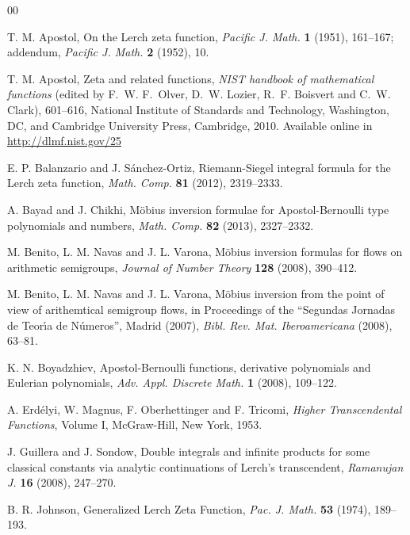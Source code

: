 \documentclass[11pt,a4paper,reqno]{amsart}
\theoremstyle{plain}
\theoremstyle{remark}
\numberwithin{equation}{section}
\begin{document}
\begin{thebibliography}{00}

T. M. Apostol,
On the Lerch zeta function,
\textit{Pacific J. Math.}
\textbf{1} (1951), 161--167;
addendum, \textit{Pacific J. Math.} \textbf{2} (1952), 10.

T. M. Apostol,
Zeta and related functions,
\textit{NIST handbook of mathematical functions}
(edited by F.~W. F.~Olver, D.~W. Lozier, R.~F. Boisvert and C.~W. Clark),
601--616,
National Institute of Standards and Technology, Washington, DC, and
Cambridge University Press, Cambridge, 2010.
Available online in \url{http://dlmf.nist.gov/25}

E. P. Balanzario and J. S\'{a}nchez-Ortiz,
Riemann-Siegel integral formula for the Lerch zeta function,
\textit{Math. Comp.}
\textbf{81} (2012), 2319--2333.

A. Bayad and J. Chikhi,
M\"obius inversion formulae for Apostol-Bernoulli type polynomials and numbers,
\textit{Math. Comp.}
\textbf{82} (2013), 2327--2332.

M. Benito, L. M. Navas and J. L. Varona,
M\"{o}bius inversion formulas for flows on arithmetic semigroups,
\textit{Journal of Number Theory}
\textbf{128} (2008), 390--412.


M. Benito, L. M. Navas and J. L. Varona,
M\"{o}bius inversion from the point of view of arithemtical semigroup flows, in
Proceedings of the ``Segundas Jornadas de Teor\'{\i}a de N\'{u}meros'', Madrid (2007),
\textit{Bibl. Rev. Mat. Iberoamericana}
(2008), 63--81.


K. N. Boyadzhiev,
Apostol-Bernoulli functions, derivative polynomials and Eulerian polynomials,
\textit{Adv. Appl. Discrete Math.}
\textbf{1} (2008), 109--122.

A. Erd\'{e}lyi, W. Magnus, F. Oberhettinger and F. Tricomi,
\textit{Higher Transcendental Functions}, Volume I,
McGraw-Hill, New York, 1953.

J. Guillera and J. Sondow,
Double integrals and infinite products for some classical constants via analytic continuations of Lerch's transcendent,
\textit{Ramanujan J.}
\textbf{16} (2008), 247--270.

B. R. Johnson,
Generalized Lerch Zeta Function,
\textit{Pac. J. Math.}
\textbf{53} (1974), 189--193.


\end{thebibliography}
\end{document}
